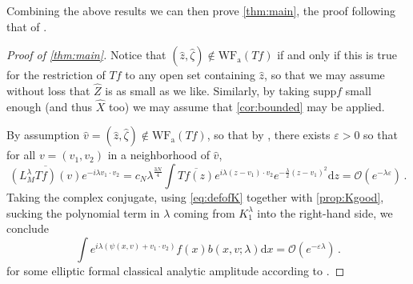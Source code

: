 \documentclass[
	fontsize=11pt, 
	twoside=false, 
	abstract=true, 
	a4paper,
]{scrartcl}
\newcommand{\eps}{\varepsilon}
\newcommand{\dd}{\mathrm{d}}
\newcommand{\abs}[1]{\left\lvert#1\right\rvert}
\newcommand{\supp}{\mathrm{supp}}
\newcommand{\wf}{\mathrm{WF}_{\mathrm{a}}}
\begin{document}
Combining the above results we can then prove \cref{thm:main}, the proof following that of \cite[Thm.~5.2]{2306.05906v1}.

\begin{proof}[Proof of \cref{thm:main}]
	Notice that $(\hat z, \hat \zeta) \not\in \wf(Tf)$ if and only if this is true for the restriction of $Tf$ to any open set containing $\hat z$, so that we may assume without loss that $\hat Z$ is as small as we like. Similarly, by taking $\supp f$ small enough (and thus $\hat X$ too) we may assume that \cref{cor:bounded} may be applied. 

	By assumption $\hat v = (\hat z, \hat \zeta) \not\in \wf(Tf)$, so that by \cite[Def.~6.1]{AST_1982__95__R3_0}, there exists $\eps >0$ so that for all $v = (v_1,v_2)$ in a neighborhood of $\hat v$,
	\[
		\overline{(L_M^\lambda Tf)(v)}e^{-i\lambda v_1\cdot v_2} = c_N \lambda^{\frac{3N}{4}} \int \overline{Tf(z)} e^{i\lambda(z-v_1)\cdot v_2} e^{-\frac{\lambda}{2} (z-v_1)^2} \dd z = \mathcal{O}(e^{-\lambda\eps})\,.
	\]
	Taking the complex conjugate, using \cref{eq:defofK} together with \cref{prop:Kgood}, sucking the polynomial term in $\lambda$ coming from $K_1^\lambda$ into the right-hand side, we conclude
	\begin{equation}\label{eq:setupforwfa}
		\int e^{i\lambda(\psi(x,v)+v_1\cdot v_2)} f(x) b(x,v;\lambda) \dd x = \mathcal{O}(e^{-\eps\lambda})\,.
	\end{equation}
	for some elliptic formal classical analytic amplitude according to \cite[\S~1]{AST_1982__95__R3_0}.


\end{proof}
\end{document}
